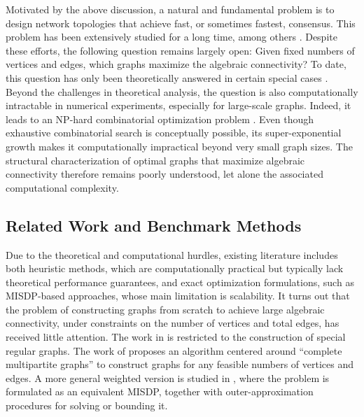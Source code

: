 \documentclass[letterpaper, 10 pt, conference]{ieeeconf}  %
\newcommand{\1}{\mathbf{1}}
\newcommand{\0}{\mathbf{0}}
\begin{document}
Motivated by the above discussion, a natural and fundamental problem is to design network topologies that achieve fast, or sometimes fastest, consensus. This problem has been extensively studied for a long time, among others \cite{moura,ming,bayen,dai,dong,ogiwara}. Despite these efforts, the following question remains largely open: Given fixed numbers of vertices and edges, which graphs maximize the algebraic connectivity?  
To date, this question has only been theoretically answered in certain special cases \cite{ogiwara,Shahbaz23}.
Beyond the challenges in theoretical analysis, the question is also computationally intractable in numerical experiments, especially for large-scale graphs. 
Indeed, it leads to an NP-hard combinatorial optimization problem \cite{MOSKAOYAMA2008677}.
Even though exhaustive combinatorial search is conceptually possible, its super-exponential growth makes it computationally impractical beyond very small graph sizes. The structural characterization of optimal graphs that maximize algebraic connectivity therefore remains poorly understood, let alone the associated computational complexity.


\subsection{Related Work and Benchmark Methods}

Due to the theoretical and computational hurdles, existing literature includes both heuristic methods, which are computationally practical but typically lack theoretical performance guarantees, and exact optimization formulations, such as MISDP-based approaches, whose main limitation is scalability.
It turns out that the problem of constructing graphs from scratch to achieve large algebraic connectivity, under constraints on the number of vertices and total edges, has received little attention.
The work in \cite{kurahashi2024depth} is restricted to the construction of special regular graphs. 
The work of \cite{Shahbaz23} proposes an algorithm centered around ``complete multipartite graphs'' to construct graphs for any feasible numbers of vertices and edges. 
A more general weighted version is studied in \cite{somisetty2025optimal}, where the problem is formulated as an equivalent MISDP, together with outer-approximation procedures for solving or bounding it.
\end{document}
